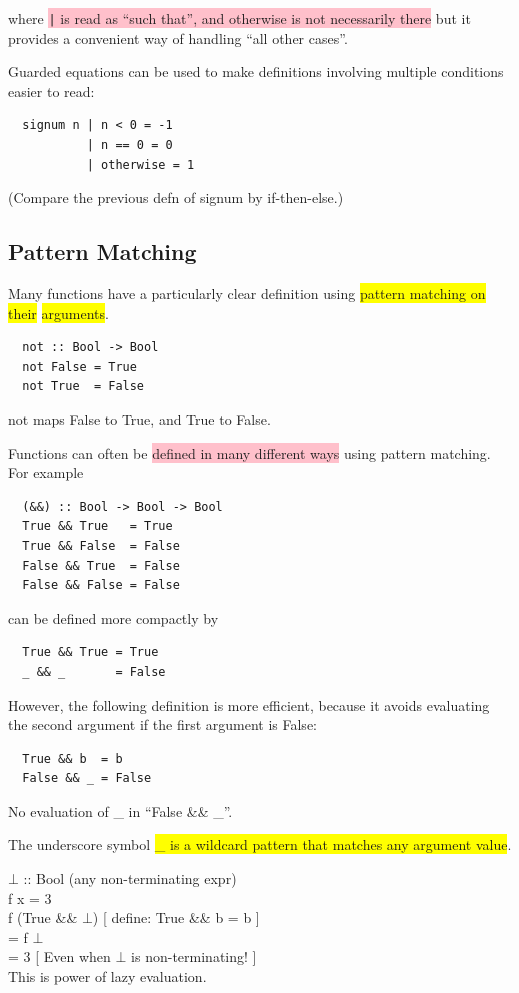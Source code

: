 \documentclass[tikz,border=10pt]{project_plan}
\begin{document}
where \colorbox{pink}{\lstinline{|} is read as “such that”, and otherwise is not
  necessarily there} but it provides a convenient way of
handling “all other cases”.

Guarded equations can be used to make definitions
involving multiple conditions easier to read:
\begin{lstlisting}
  signum n | n < 0 = -1
           | n == 0 = 0
           | otherwise = 1
\end{lstlisting}
(Compare the previous defn of signum by if-then-else.)

\subsection{Pattern Matching}

Many functions have a particularly clear definition
using \colorbox{yellow}{pattern matching on their} \colorbox{yellow}{arguments}.
\begin{lstlisting}
  not :: Bool -> Bool
  not False = True
  not True  = False
\end{lstlisting}
not maps False to True, and True to False.

Functions can often be \colorbox{pink}{defined in many different ways}
using pattern matching. For example
\begin{lstlisting}
  (&&) :: Bool -> Bool -> Bool
  True && True   = True
  True && False  = False
  False && True  = False
  False && False = False
\end{lstlisting}

can be defined more compactly by
\begin{lstlisting}
  True && True = True
  _ && _       = False
\end{lstlisting}

However, the following definition is more efficient, because
it avoids evaluating the second argument if the first
argument is False:
\begin{lstlisting}
  True && b  = b
  False && _ = False
\end{lstlisting}
No evaluation of \_ in “False \&\& \_”.

The underscore symbol \colorbox{yellow}{\_ is a wildcard pattern that
  matches any argument value}.

$\bot$ :: Bool (any non-terminating expr)\\
f x = 3\\
f (True \&\& $\bot$) [ define: True \&\& b = b ]\\
= f $\bot$\\
= 3 [ Even when $\bot$ is non-terminating! ]\\
This is power of lazy evaluation.
\end{document}
